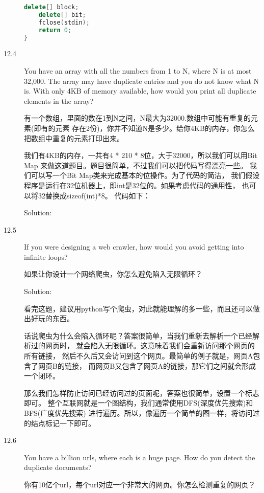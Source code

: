 \begin{description}
\begin{lstlisting}[language=C++]
    delete[] block;
    delete[] bit;
    fclose(stdin);
    return 0;
}
\end{lstlisting}


\item[12.4] You have an array with all the numbers from 1 to N, where N is at most 32,000. The array may have duplicate entries and you do not know what N is. With only 4KB of memory available, how would you print all duplicate elements in the array?

有一个数组，里面的数在1到N之间，N最大为32000.数组中可能有重复的元素(即有的元素 存在2份)，你并不知道N是多少。给你4KB的内存，你怎么把数组中重复的元素打印出来。

我们有4KB的内存，一共有4 * 210 * 8位，大于32000，所以我们可以用Bit Map 来做这道题目。题目很简单，不过我们可以把代码写得漂亮一些。 我们可以写一个Bit Map类来完成基本的位操作。为了代码的简洁， 我们假设程序是运行在32位机器上，即int是32位的。如果考虑代码的通用性， 也可以将32替换成sizeof(int)*8。 代码如下：

Solution: 




\item[12.5] If you were designing a web crawler, how would you avoid getting into infinite loops?

如果让你设计一个网络爬虫，你怎么避免陷入无限循环？

Solution: 

看完这题，建议用python写个爬虫，对此就能理解的多一些，而且还可以做出好玩的东西。

话说爬虫为什么会陷入循环呢？答案很简单，当我们重新去解析一个已经解析过的网页时， 就会陷入无限循环。这意味着我们会重新访问那个网页的所有链接， 然后不久后又会访问到这个网页。最简单的例子就是，网页A包含了网页B的链接， 而网页B又包含了网页A的链接，那它们之间就会形成一个闭环。

那么我们怎样防止访问已经访问过的页面呢，答案也很简单，设置一个标志即可。 整个互联网就是一个图结构，我们通常使用DFS(深度优先搜索)和BFS(广度优先搜索) 进行遍历。所以，像遍历一个简单的图一样，将访问过的结点标记一下即可。


\item[12.6] You have a billion urls, where each is a huge page. How do you detect the duplicate documents?

你有10亿个url，每个url对应一个非常大的网页。你怎么检测重复的网页？


\end{description}
